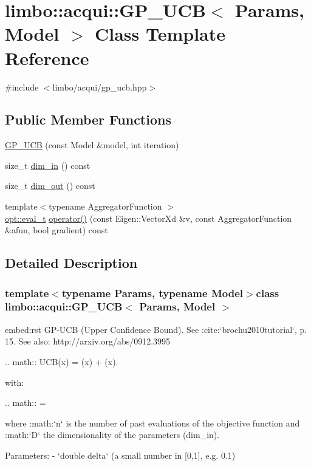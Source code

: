 \hypertarget{classlimbo_1_1acqui_1_1_g_p___u_c_b}{}\section{limbo\+:\+:acqui\+:\+:G\+P\+\_\+\+U\+C\+B$<$ Params, Model $>$ Class Template Reference}
\label{classlimbo_1_1acqui_1_1_g_p___u_c_b}


{\ttfamily \#include $<$limbo/acqui/gp\+\_\+ucb.\+hpp$>$}

\subsection*{Public Member Functions}
\begin{DoxyCompactItemize}
\item 
\hyperlink{classlimbo_1_1acqui_1_1_g_p___u_c_b_a9846faaa39b1d1d7b039284f2c905205}{G\+P\+\_\+\+U\+C\+B} (const Model \&model, int iteration)
\item 
size\+\_\+t \hyperlink{classlimbo_1_1acqui_1_1_g_p___u_c_b_a30c58b2f857da76de61e8cf555e73d06}{dim\+\_\+in} () const 
\item 
size\+\_\+t \hyperlink{classlimbo_1_1acqui_1_1_g_p___u_c_b_abde3ddcfa0bfb16d453587832f4e78b1}{dim\+\_\+out} () const 
\item 
{\footnotesize template$<$typename Aggregator\+Function $>$ }\\\hyperlink{group__opt__tools_ga7fc87080ebf563d050fc547d25528ef0}{opt\+::eval\+\_\+t} \hyperlink{classlimbo_1_1acqui_1_1_g_p___u_c_b_a81dbe2aae8aea9d463547ac4d9236741}{operator()} (const Eigen\+::\+Vector\+Xd \&v, const Aggregator\+Function \&afun, bool gradient) const 
\end{DoxyCompactItemize}


\subsection{Detailed Description}
\subsubsection*{template$<$typename Params, typename Model$>$class limbo\+::acqui\+::\+G\+P\+\_\+\+U\+C\+B$<$ Params, Model $>$}

\begin{DoxyVerb}embed:rst
GP-UCB (Upper Confidence Bound). See :cite:`brochu2010tutorial`, p. 15. See also: http://arxiv.org/abs/0912.3995

.. math::
  UCB(x) = \mu(x) + \kappa \sigma(x).

with:

.. math::
  \kappa = 

where :math:`n` is the number of past evaluations of the objective function and :math:`D` the dimensionality of the parameters (dim_in).

Parameters:
  - `double delta` (a small number in [0,1], e.g. 0.1)
\end{DoxyVerb}
 

